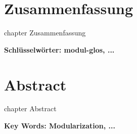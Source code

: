 
%

\chapter*{Zusammenfassung}
   {chapter} {Zusammenfassung}


  \textbf{Schlüsselwörter:
    \gls{modul-glos},
    ...
  }

\newpage

\chapter*{Abstract}
   {chapter} {Abstract}


  \textbf{Key Words:
    Modularization,
    ...
  }
